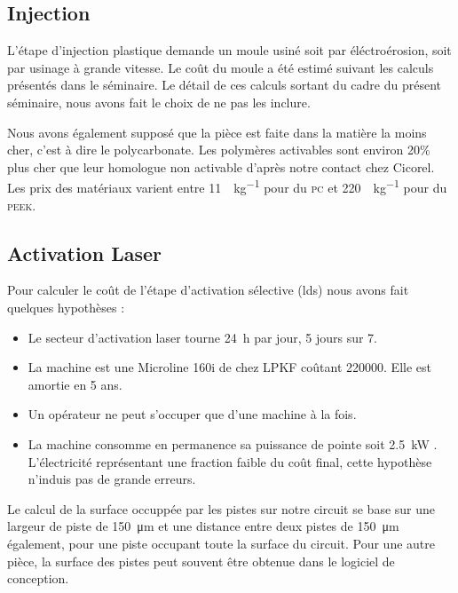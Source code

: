 \subsection{Injection}

L'étape d'injection plastique demande un moule usiné soit par éléctroérosion, soit par usinage à grande vitesse.
Le coût du moule a été estimé suivant les calculs présentés dans le séminaire\cite{electroerosion-2013}.
Le détail de ces calculs sortant du cadre du présent séminaire, nous avons fait le choix de ne pas les inclure. 

Nous avons également supposé que la pièce est faite dans la matière la moins cher, c'est à dire le polycarbonate.
Les polymères activables sont environ 20\% plus cher que leur homologue non activable d'après notre contact chez Cicorel.
Les prix des matériaux varient entre \SI{11}{\chf\per\kilogram} pour du \textsc{pc} et \SI{220}{\chf\per\kilogram} pour du \textsc{peek}.

\subsection{Activation Laser}
Pour calculer le coût de l'étape d'activation sélective (\gls{lds}) nous avons fait quelques hypothèses :
\begin{itemize}
    \item Le secteur d'activation laser tourne \SI{24}{\hour} par jour, 5 jours sur 7.
    \item La machine est une Microline 160i de chez LPKF coûtant \SI{220000}{\chf}.
        Elle est amortie en 5 ans.
    \item Un opérateur ne peut s'occuper que d'une machine à la fois.
    \item La machine consomme en permanence sa puissance de pointe soit \SI{2.5}{\kilo\watt} \cite{lpkf-microline-series}.
        L'électricité représentant une fraction faible du coût final, cette hypothèse n'induis pas de grande erreurs.
\end{itemize}

Le calcul de la surface occuppée par les pistes sur notre circuit se base sur une largeur de piste de \SI{150}{\micro\meter} et une
distance entre deux pistes de \SI{150}{\micro\meter} également, pour une piste occupant toute la surface du circuit.
Pour une autre pièce, la surface des pistes peut souvent être obtenue dans le logiciel de conception.



